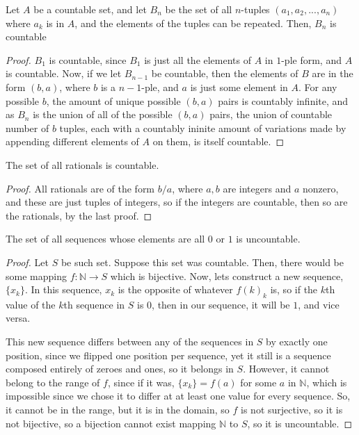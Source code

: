\documentclass{article}
\begin{document}
		\begin{theorem}
		Let $A$ be a countable set, and let $B_n$ be the set of all $n$-tuples $(a_1, a_2, ..., a_n)$ where $a_k$ is in $A$, and the elements of the tuples can be repeated. Then, $B_n$ is countable
		\end{theorem}

		\begin{proof}
			$B_1$ is countable, since $B_1$ is just all the elements of $A$ in $1$-ple form, and $A$ is countable. Now, if we let $B_{n-1}$ be countable, then the elements of $B$ are in the form $(b,a)$, where $b$ is a $n-1$-ple, and $a$ is just some element in $A$. For any possible $b$, the amount of unique possible $(b,a)$ pairs is countably infinite, and as $B_n$ is the union of all of the possible $(b,a)$ pairs, the union of countable number of $b$ tuples, each with a countably ininite amount of variations made by appending different elements of $A$ on them, is itself countable. 
		\end{proof}

		\begin{theorem}
The set of all rationals is countable.
		\end{theorem}

		\begin{proof}
All rationals are of the form $b/a$, where $a,b$ are integers and $a$ nonzero, and these are just tuples of integers, so if the integers are countable, then so are the rationals, by the last proof.
		\end{proof}

		\begin{theorem}
			The set of all sequences whose elements are all $0$ or $1$ is uncountable.

		\end{theorem}

		\begin{proof}
			Let $S$ be such set. Suppose this set was countable. Then, there would be some mapping $f: \mathbb{N} \to S$ which is bijective. Now, lets construct a new sequence, $\{x_k\}$. In this sequence, $x_k$ is the opposite of whatever $f(k)_k$ is, so if the $k$th value of the $k$th sequence in $S$ is $0$, then in our sequence, it will be $1$, and vice versa.

			This new sequence differs between any of the sequences in $S$ by exactly one position, since we flipped one position per sequence, yet it still is a sequence composed entirely of zeroes and ones, so it belongs in $S$. However, it cannot belong to the range of $f$, since if it was, $\{x_k\} = f(a)$ for some $a$ in $\mathbb{N}$, which is impossible since we chose it to differ at at least one value for every sequence. So, it cannot be in the range, but it is in the domain, so $f$ is not surjective, so it is not bijective, so a bijection cannot exist mapping $\mathbb{N}$ to $S$, so it is uncountable.
		\end{proof}
\end{document}
